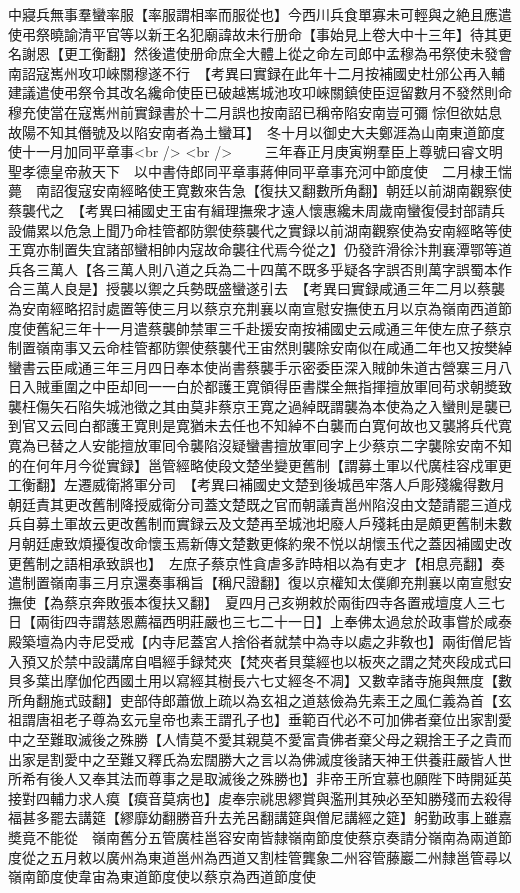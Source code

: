 中寢兵無事羣蠻率服【率服謂相率而服從也】今西川兵食單寡未可輕與之絶且應遣使弔祭曉諭清平官等以新王名犯廟諱故未行册命【事始見上卷大中十三年】待其更名謝恩【更工衡翻】然後遣使册命庶全大體上從之命左司郎中孟穆為弔祭使未發會南詔寇嶲州攻卭崍關穆遂不行　【考異曰實録在此年十二月按補國史杜邠公再入輔建議遣使弔祭令其改名纔命使臣已破越嶲城池攻卭崍關鎮使臣逗留數月不發然則命穆充使當在寇嶲州前實録書於十二月誤也按南詔已稱帝陷安南豈可彌悰但欲姑息故陽不知其僭號及以陷安南者為土蠻耳】　冬十月以御史大夫鄭涯為山南東道節度使十一月加同平章事<br />
<br />
　　三年春正月庚寅朔羣臣上尊號曰睿文明聖孝德皇帝赦天下　以中書侍郎同平章事蔣伸同平章事充河中節度使　二月棣王惴薨　南詔復寇安南經略使王寛數來告急【復扶又翻數所角翻】朝廷以前湖南觀察使蔡襲代之　【考異曰補國史王宙有緝理撫衆才遠人懷惠纔未周歲南蠻復侵封部請兵設備累以危急上聞乃命桂管都防禦使蔡襲代之實録以前湖南觀察使為安南經略等使王寛亦制置失宜諸部蠻相帥内寇故命襲往代焉今從之】仍發許滑徐汴荆襄潭鄂等道兵各三萬人【各三萬人則八道之兵為二十四萬不既多乎疑各字誤否則萬字誤蜀本作合三萬人良是】授襲以禦之兵勢既盛蠻遂引去　【考異曰實録咸通三年二月以蔡襲為安南經略招討處置等使三月以蔡京充荆襄以南宣慰安撫使五月以京為嶺南西道節度使舊紀三年十一月遣蔡襲帥禁軍三千赴援安南按補國史云咸通三年使左庶子蔡京制置嶺南事又云命桂管都防禦使蔡襲代王宙然則襲除安南似在咸通二年也又按樊綽蠻書云臣咸通三年三月四日奉本使尚書蔡襲手示密委臣深入賊帥朱道古營寨三月八日入賊重圍之中臣却囘一一白於都護王寛領得臣書牒全無指揮擅放軍囘苟求朝奬致襲枉傷矢石陷失城池徵之其由莫非蔡京王寛之過綽既謂襲為本使為之入蠻則是襲已到官又云囘白都護王寛則是寛猶未去任也不知綽不白襲而白寛何故也又襲將兵代寛寛為已替之人安能擅放軍囘令襲陷沒疑蠻書擅放軍囘字上少蔡京二字襲除安南不知的在何年月今從實録】邕管經略使段文楚坐變更舊制【謂募土軍以代廣桂容戍軍更工衡翻】左遷威衛將軍分司　【考異曰補國史文楚到後城邑牢落人戶彫殘纔得數月朝廷責其更改舊制降授威衛分司蓋文楚既之官而朝議責邕州陷沒由文楚請罷三道戍兵自募土軍故云更改舊制而實録云及文楚再至城池圯廢人戶殘耗由是頗更舊制未數月朝廷慮致煩擾復改命懷玉焉新傳文楚數更條約衆不悦以胡懷玉代之蓋因補國史改更舊制之語相承致誤也】　左庶子蔡京性貪虐多詐時相以為有吏才【相息亮翻】奏遣制置嶺南事三月京還奏事稱旨【稱尺證翻】復以京權知太僕卿充荆襄以南宣慰安撫使【為蔡京奔敗張本復扶又翻】　夏四月己亥朔敕於兩街四寺各置戒壇度人三七日【兩街四寺謂慈恩薦福西明莊嚴也三七二十一日】上奉佛太過怠於政事嘗於咸泰殿築壇為内寺尼受戒【内寺尼蓋宮人捨俗者就禁中為寺以處之非敎也】兩街僧尼皆入預又於禁中設講席自唱經手録梵夾【梵夾者貝葉經也以板夾之謂之梵夾段成式曰貝多葉出摩伽佗西國土用以寫經其樹長六七丈經冬不凋】又數幸諸寺施與無度【數所角翻施式豉翻】吏部侍郎蕭倣上疏以為玄祖之道慈儉為先素王之風仁義為首【玄祖謂唐祖老子尊為玄元皇帝也素王謂孔子也】垂範百代必不可加佛者棄位出家割愛中之至難取滅後之殊勝【人情莫不愛其親莫不愛富貴佛者棄父母之親捨王子之貴而出家是割愛中之至難又釋氏為宏闊勝大之言以為佛滅度後諸天神王供養莊嚴皆人世所希有後人又奉其法而尊事之是取滅後之殊勝也】非帝王所宜慕也願陛下時開延英接對四輔力求人瘼【瘼音莫病也】䖍奉宗祧思繆賞與濫刑其殃必至知勝殘而去殺得福甚多罷去講筵【繆靡幼翻勝音升去羌呂翻講筵與僧尼講經之筵】躬勤政事上雖嘉奬竟不能從　嶺南舊分五管廣桂邕容安南皆隸嶺南節度使蔡京奏請分嶺南為兩道節度從之五月敕以廣州為東道邕州為西道又割桂管龔象二州容管藤巖二州隸邕管尋以嶺南節度使韋宙為東道節度使以蔡京為西道節度使